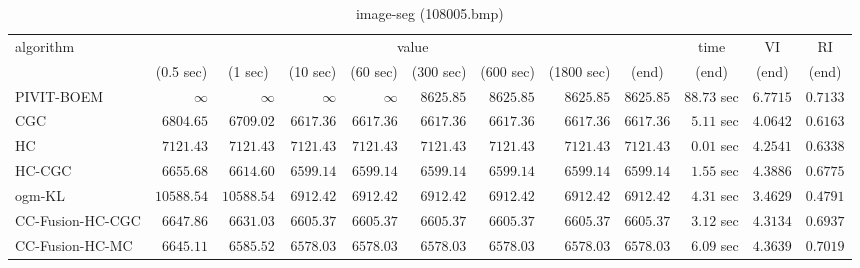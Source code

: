 \begin{table}[H]
\scriptsize
\centering
\caption{image-seg (108005.bmp)}
\label{tab:anytimetable-image-seg-108005.bmp}
\begin{tabular}{lrrrrrrrrrrr}
\toprule
           algorithm &                                   \multicolumn{8}{c}{value} & \multicolumn{1}{c}{time}    & \multicolumn{1}{c}{VI}  & \multicolumn{1}{c}{RI} \\  
\cmidrule(lr){2-9}\cmidrule(lr){10-10} \cmidrule(lr){11-11} \cmidrule(lr){12-12}   
                     & \multicolumn{1}{c}{(0.5 sec)} & \multicolumn{1}{c}{(1 sec)} & \multicolumn{1}{c}{(10 sec)} & \multicolumn{1}{c}{(60 sec)} & \multicolumn{1}{c}{(300 sec)} & \multicolumn{1}{c}{(600 sec)} & \multicolumn{1}{c}{(1800 sec)} & \multicolumn{1}{c}{(end)} & \multicolumn{1}{c}{(end)}    & \multicolumn{1}{c}{(end)}   & \multicolumn{1}{c}{(end)}  \\ \midrule 
          PIVIT-BOEM & $\infty$ & $\infty$ & $\infty$ & $\infty$ & $      8625.85$ & $      8625.85$ & $      8625.85$ & $      8625.85$ & $        88.73$ sec    & $       6.7715$  & $       0.7133$ \\ 
                 CGC & $      6804.65$ & $      6709.02$ & $      6617.36$ & $      6617.36$ & $      6617.36$ & $      6617.36$ & $      6617.36$ & $      6617.36$ & $         5.11$ sec    & $       4.0642$  & $       0.6163$ \\ 
                  HC & $      7121.43$ & $      7121.43$ & $      7121.43$ & $      7121.43$ & $      7121.43$ & $      7121.43$ & $      7121.43$ & $      7121.43$ & $         0.01$ sec    & $       4.2541$  & $       0.6338$ \\ 
              HC-CGC & $      6655.68$ & $      6614.60$ & $      6599.14$ & $      6599.14$ & $      6599.14$ & $      6599.14$ & $      6599.14$ & $      6599.14$ & $         1.55$ sec    & $       4.3886$  & $       0.6775$ \\ 
              ogm-KL & $     10588.54$ & $     10588.54$ & $      6912.42$ & $      6912.42$ & $      6912.42$ & $      6912.42$ & $      6912.42$ & $      6912.42$ & $         4.31$ sec    & $       3.4629$  & $       0.4791$ \\ 
    CC-Fusion-HC-CGC & $      6647.86$ & $      6631.03$ & $      6605.37$ & $      6605.37$ & $      6605.37$ & $      6605.37$ & $      6605.37$ & $      6605.37$ & $         3.12$ sec    & $       4.3134$  & $       0.6937$ \\ 
     CC-Fusion-HC-MC & $      6645.11$ & $      6585.52$ & $      6578.03$ & $      6578.03$ & $      6578.03$ & $      6578.03$ & $      6578.03$ & $      6578.03$ & $         6.09$ sec    & $       4.3639$  & $       0.7019$ \\ 

\end{tabular}
\end{table}
